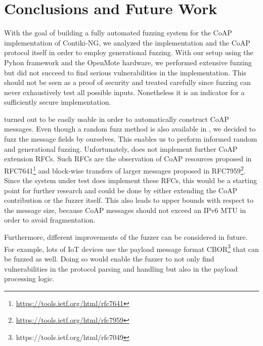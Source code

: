 \section{Conclusions and Future Work}
\label{section:conclusion}


With the goal of building a fully automated fuzzing system for the CoAP implementation of Contiki-NG, we analyzed the implementation and the CoAP protocol itself in order to employ generational fuzzing. With our setup using the Pyhon framework \scapy and the OpenMote hardware, we performed extensive fuzzing but did not succeed to find serious vulnerabilities in the implementation. This should not be seen as a proof of security and treated carefully since fuzzing can never exhaustively test all possible inputs. Nonetheless it is an indicator for a sufficiently secure implementation.

\scapy turned out to be easily usable in order to automatically construct CoAP messages. Even though a random fuzz method is also available in \scapy, we decided to fuzz the message fields by ourselves. This enables us to perform informed random and generational fuzzing. Unfortunately, \scapy does not implement further CoAP extension RFCs. Such RFCs are the observation of CoAP resources proposed in RFC7641\footnote{\url{https://tools.ietf.org/html/rfc7641}} and block-wise transfers of larger messages proposed in RFC7959\footnote{\url{https://tools.ietf.org/html/rfc7959}}. Since the system under test does implement these RFCs, this would be a starting point for further research and could be done by either extending the \scapy CoAP contribution or the fuzzer itself. This also leads to upper bounds with respect to the message size, because CoAP messages should not exceed an IPv6 MTU in order to avoid fragmentation.

Furthermore, different improvements of the fuzzer can be considered in future. For example, lots of IoT devices use the payload message format CBOR\footnote{https://tools.ietf.org/html/rfc7049} that can be fuzzed as well. Doing so would enable the fuzzer to not only find vulnerabilities in the protocol parsing and handling but also in the payload processing logic. 

